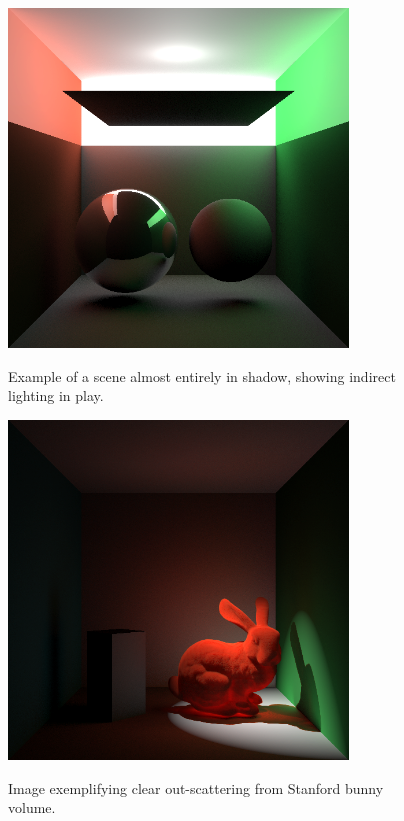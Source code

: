\documentclass[12pt]{ucthesis}
\newcommand{\captionfonts}{\small\bf\ssp}
\begin{document}
\begin{figure}[h!]
    \centering
    \includegraphics[height=90mm]{img/two_sphere_indir.png}
    \captionfonts
    \caption{Example of a scene almost entirely in shadow, showing indirect lighting in play.}
\end{figure}

\begin{figure}[h!]
    \centering
    \includegraphics[height=90mm]{img/ketchup_good_corrected.png}
    \captionfonts
    \caption{Image exemplifying clear out-scattering from Stanford bunny volume.}
\end{figure}
\end{document}
